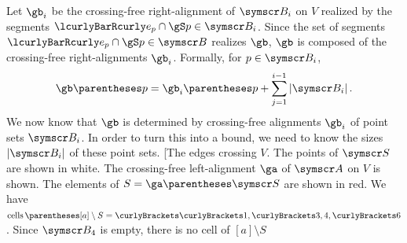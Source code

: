 Let $\gb_i$ be the crossing-free right-alignment of $\pointset B_i$ on $V$ realized by
the segments $\setst{e_p\Intersection \gS}{p\in\pointset B_i}$.
Since the set of segments $\setst{e_p\Intersection \gS}{p\in\pointset B}$ realizes $\gb$,
$\gb$ is composed of the crossing-free right-alignments $\gb_i$. Formally, for
$p\in\pointset B_i$,
\[\gb\of p = \gb_i\of p + \sum{j=1}[i-1] \Cardinality{\pointset B_i}\text.\]
We now know that $\gb$ is determined by crossing-free alignments $\gb_i$ of point sets $\pointset B_i$.
In order to turn this into a bound, we need to know the sizes $\Cardinality{\pointset B_i}$ of these
point sets.
\marginfig[The edges crossing $V$. The points of $\pointset S$ are shown in white. The
crossing-free left-alignment $\ga$ of $\pointset A$ on $V$ is shown.
The elements of $S=\ga\of{\pointset S}$ are shown in red.
We have $\cells\of{[a]\setminus S}=\set{\set{1},\set{3,4},\set{6}}$.
Since $\pointset B_4$ is empty, there is no cell of ${[a]\setminus S}$
